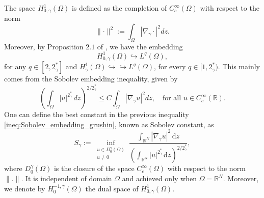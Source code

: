 \documentclass[11pt]{article}
\newcommand{\om} {\Omega}
\newcommand{\real}{\mathbb{R}}
\newcommand{\rnn}{\mathbb{R}^{N}}
\newcommand{\lv}{\lVert}
\newcommand{\rv}{\rVert}
\newcommand{\grad}{\nabla}
\newcommand{\gradgr}{\nabla_{\gamma}}
\newcommand{\spacegr}{H^{1}_{0,\gamma}(\Omega)}
\begin{document}
The space $\spacegr$ is defined as the completion of $C_c^\infty(\Omega)$ with respect to the norm 
\begin{equation*}
    \lv \cdot \rv^2 := \int_{\om} | \gradgr  \cdot |^2 dz.
\end{equation*}
Moreover, by Proposition $2.1$ of \cite{alves_tyagi_brezis-nirenberg}, we have the embedding
\begin{equation*}
   \spacegr \hookrightarrow L^q(\om),
\end{equation*}
for any $q \in [2, 2_\gamma^*]$ and  $H_\gamma^1(\Omega) \hookrightarrow\hookrightarrow L^q(\Omega)$, for every $q \in [1, 2_\gamma^*)$. This mainly comes from the Sobolev embedding inequality, given by
\begin{equation}\label{ineq:Sobolev_embedding_grushin}
    \left( \int_{\om} |u|^{2_{\gamma}^*} \, dz \right)^{2/2_{\gamma}^*} \leq C \int_{\om} |\gradgr u |^2 dz, \quad \text{for all } u \in C_{c}^{\infty}(\real). 
\end{equation}
One can define the best constant in the previous inequality \eqref{ineq:Sobolev_embedding_grushin}, known as Sobolev constant, as
\begin{equation}\label{best_constant_grushin}
    S_{\gamma} := \inf_{\substack{u \in D_0^\gamma(\om) \\ u \neq 0}} \frac{\int_{\mathbb{R}^N} |\nabla_\gamma u|^2 \, \mathrm{d}z}{\left( \int_{\mathbb{R}^N} |u|^{2_\gamma^*} \, \mathrm{d}z \right)^{2/2_\gamma^*}},
\end{equation}
where $D_0^\gamma(\om)$ is the closure of the space $C_c^{\infty}(\om)$ with respect to the norm $\lv . \rv$. It is independent of domain $\om$ and achieved only when $\om = \rnn$. Moreover, we denote by $H_0^{-1,\gamma}(\om)$ the dual space of $\spacegr$.\\
\end{document}
